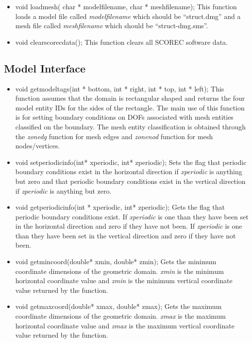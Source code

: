 \begin{itemize}
\item void loadmesh( char * modelfilename, char * meshfilename); This function
loads a model file called \textit{modelfilename} which should be ``struct.dmg'' 
and a mesh file called \textit{meshfilename} which should be ``struct-dmg.sms''.
\item void clearscorecdata(); This function clears all SCOREC software data.
\end{itemize}


\subsection{Model Interface}
\begin{itemize}
\item  void getmodeltags(int * bottom, int * right, int * top, int * left); This
function assumes that the domain is rectangular shaped and returns the four model entity 
IDs for the sides of the rectangle.  The main use of this function is for setting boundary 
conditions on DOFs associated with mesh entities classified on the boundary.  The mesh entity
classification is obtained through the \textit{zonedg} function 
for mesh edges and \textit{zonenod} function for
mesh nodes/vertices.
\item  void setperiodicinfo(int* xperiodic, int* zperiodic); Sets the flag that periodic
boundary conditions exist in the horizontal direction if \textit{xperiodic} is anything but zero
and that periodic
boundary conditions exist in the vertical direction if \textit{zperiodic} is anything but zero.
\item  void getperiodicinfo(int * xperiodic, int* zperiodic);	Gets the flag that periodic
boundary conditions exist.  If \textit{xperiodic} is one than they have been set in
the horizontal direction and zero if they have not been. If
 \textit{zperiodic} is one than they have been set in
the vertical direction and zero if they have not been.
\item  void getmincoord(double* xmin, double* zmin); Gets the minimum coordinate dimensions of the geometric domain. 
\textit{xmin} is the minimum horizontal coordinate value and \textit{zmin} is the minimum vertical coordinate value
returned by the function.
\item  void getmaxcoord(double* xmax, double* zmax); Gets the maximum coordinate dimensions of the geometric domain.  
\textit{xmax} is the maximum horizontal coordinate value and \textit{zmax} is the maximum vertical coordinate value
returned by the function.
\end{itemize}

